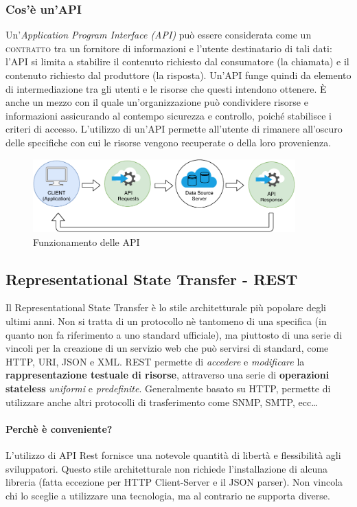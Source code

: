 \subsubsection{Cos'è un'API}
Un'\textit{Application Program Interface (API)} può essere considerata come un \textsc{contratto} tra un fornitore di informazioni e l'utente destinatario di tali dati: l'API si limita a stabilire il contenuto richiesto dal consumatore (la chiamata) e il contenuto richiesto dal produttore (la risposta). Un'API funge quindi da elemento di intermediazione tra gli utenti e le risorse che questi intendono ottenere. È anche un mezzo con il quale un'organizzazione può condividere risorse e informazioni assicurando al contempo sicurezza e controllo, poiché stabilisce i criteri di accesso. L'utilizzo di un'API permette all'utente di rimanere all'oscuro delle specifiche con cui le risorse vengono recuperate o della loro provenienza.
\begin{figure}[H]
    \centering
    \includegraphics[width=0.90\textwidth]{images/01_9_api.pdf}
    \caption{Funzionamento delle API}
    \label{fig:api}
\end{figure}

\subsection{Representational State Transfer - REST}
Il Representational State Transfer è lo stile architetturale più popolare degli ultimi anni. Non si tratta di un protocollo nè tantomeno di una specifica (in quanto non fa riferimento a uno standard ufficiale), ma piuttosto di una serie di vincoli per la creazione di un servizio web che può servirsi di standard,  come HTTP, URI, JSON e XML. REST permette di \textit{accedere} e \textit{modificare} la \textbf{rappresentazione testuale di risorse}, attraverso una serie di \textbf{operazioni stateless} \textit{uniformi} e \textit{predefinite}. Generalmente basato su HTTP, permette di utilizzare anche altri protocolli di trasferimento come SNMP, SMTP, ecc\dots

\paragraph{Perchè è conveniente?} L'utilizzo di API Rest fornisce una notevole quantità di libertà e flessibilità agli sviluppatori. Questo stile architetturale non richiede l'installazione di alcuna libreria (fatta eccezione per HTTP Client-Server e il JSON parser). Non vincola  chi lo sceglie a utilizzare una tecnologia, ma al contrario ne supporta diverse.

